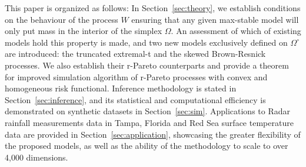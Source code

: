 \documentclass[12pt]{article}
\begin{document}
This paper is organized as follows: In Section~\ref{sec:theory}, we establish conditions on the behaviour of the process $W$ ensuring that any given max-stable model will only put mass in the interior of the simplex $\Omega$. An assessment of which of existing models hold this property is made, and two new models exclusively defined on $\Omega^\circ$ are introduced: the truncated extremal-t and the skewed Brown-Resnick processes. We also establish their r-Pareto counterparts and provide a theorem for improved simulation algorithm of r-Pareto processes with convex and homogeneous risk functional. Inference methodology is stated in Section~\ref{sec:inference}, and its statistical and computational efficiency is demonstrated on synthetic datasets in Section~\ref{sec:sim}. Applications to Radar rainfall measurements data in Tampa, Florida and Red Sea surface temperature data are provided in Section~\ref{sec:application}, showcasing the greater flexibility of the proposed models, as well as the ability of the methodology to scale to over 4,000 dimensions.

\end{document}
